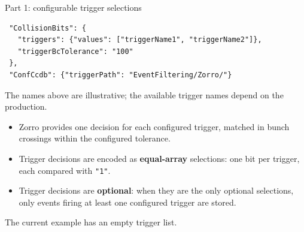\begin{frame}[fragile]{Part 1: configurable trigger selections}
 \begin{lstlisting}
 "CollisionBits": {
   "triggers": {"values": ["triggerName1", "triggerName2"]},
   "triggerBcTolerance": "100"
 },
 "ConfCcdb": {"triggerPath": "EventFiltering/Zorro/"}
 \end{lstlisting}
 \small The names above are illustrative; the available trigger names depend on the production.
 \begin{itemize}
 \item Zorro provides one decision for each configured trigger, matched in bunch crossings within the configured tolerance.
 \item Trigger decisions are encoded as \textbf{equal-array} selections: one bit per trigger, each compared with \texttt{"1"}.
 \item Trigger decisions are \textbf{optional}: when they are the only optional selections, only events firing at least one configured trigger are stored.
 \end{itemize}
 \small The current example has an empty trigger list.
\end{frame}

